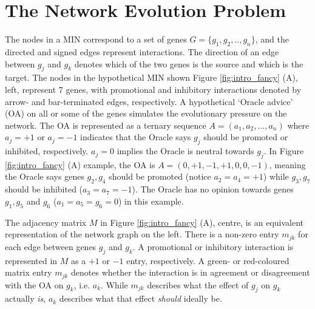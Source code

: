 \section{The Network Evolution Problem}
      The nodes in a MIN correspond to a set of genes $G=\{g_1,g_2,..,g_n\}$, and the directed and signed edges represent
       interactions. The direction of an edge between $g_j$ and $g_k$ denotes which of the two genes is the source and which is the target. The nodes in the hypothetical MIN shown Figure \ref{fig:intro_fancy} (A), left,  represent 7  genes, with promotional and inhibitory interactions denoted by arrow- and bar-terminated edges, respectively. A hypothetical `Oracle advice' (OA) on all or some of the genes simulates the evolutionary pressure on the network. The OA is represented as a ternary sequence $A = (a_1,a_2,\dots,a_n)$ where $a_j=+1$ or $a_j=-1$ indicates that the Oracle says $g_j$ should be promoted or inhibited, respectively. $a_j=0$ implies the Oracle is neutral towards $g_j$. In Figure \ref{fig:intro_fancy} (A) example, the OA is $A=(0,+1,-1,+1,0,0,-1)$, meaning the Oracle says genes $g_2,g_4$ should be promoted (notice $a_2=a_4=+1$) while $g_3,g_7$ should be inhibited ($a_3=a_7=-1$). The Oracle has no opinion towards genes $g_1,g_5$ and $g_6$ ($a_1=a_5=g_6=0$) in this example.

      The adjacency matrix $M$ in Figure \ref{fig:intro_fancy} (A), centre, is an equivalent representation of the network graph on the left. There is a non-zero entry $m_{jk}$ for each edge between genes $g_j$ and $g_k$. A promotional or inhibitory interaction is represented in $M$ as a $+1$ or $-1$ entry, respectively.  A green- or red-coloured matrix entry $m_{jk}$ denotes whether the interaction is in agreement or disagreement with the OA on $g_k$, i.e. $a_k$. While $m_{jk}$ describes what the effect of $g_j$ on $g_k$ actually \textit{is}, $a_k$ describes what that effect \textit{should} ideally be.

